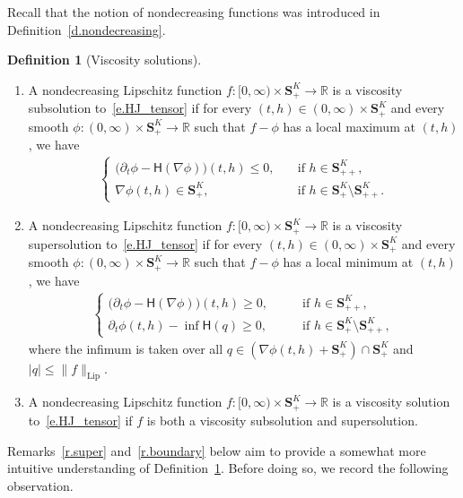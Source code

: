 \documentclass[10pt]{amsart}
\theoremstyle{definition}\newtheorem{defi}[theo]{Definition}\newtheorem{rema}[theo]{Remark}\newtheorem{exam}[theo]{Example}\newtheorem{exem}[theo]{Example}\newtheorem{nota}[theo]{Notation}
\newcommand{\R}{\mathbb{R}}
\renewcommand{\S}{\mathbf{S}}
\newcommand{\Lip}{\mathrm{Lip}}
\renewcommand{\H}{\mathsf{H}}
\renewcommand{\leq}{\leqslant}
\renewcommand{\geq}{\geqslant}
\begin{document}
Recall that the notion of nondecreasing functions was introduced in Definition~\ref{d.nondecreasing}.

\pagebreak
\begin{defi}[Viscosity solutions]\label{def:vs}
\leavevmode
\begin{enumerate}
\item \label{defi4.1.1} A nondecreasing Lipschitz function $f:[0,\infty)\times \S^K_+\to \R$ is a viscosity subsolution to~\eqref{e.HJ_tensor} if for every $(t,h) \in (0,\infty)\times \S^K_+$ and every smooth $\phi:(0,\infty)\times \S^K_+ \to \R$ such that $f-\phi$ has a local maximum at $(t,h)$, we have
\begin{align*}
\begin{cases}
\big(\partial_t \phi - \H\left(\nabla\phi\right)\big)(t,h)\leq 0, \quad &\text{if }h\in \S^K_{++},\\
\nabla\phi(t,h) \in\S^K_+, \quad &\text{if }h\in \S^K_+\setminus\S^K_{++}.
\end{cases}
\end{align*}


\item \label{item:vs_2}
A nondecreasing Lipschitz function $f:[0,\infty)\times \S^K_+\to \R$ is a viscosity supersolution to~\eqref{e.HJ_tensor} if for every $(t,h) \in (0,\infty)\times \S^K_+$ and every smooth $\phi:(0,\infty)\times \S^K_+ \to \R$ such that $f-\phi$ has a local minimum at $(t,h)$, we have
\begin{align*}
\begin{cases}
\big(\partial_t \phi - \H(\nabla\phi)\big)(t,h)\geq 0, \quad &\text{if }h\in \S^K_{++},\\
\partial_t \phi (t,h) - \inf \H(q)\geq 0,\qquad &\text{if }h\in \S^K_+\setminus\S^K_{++},
\end{cases}
\end{align*}
where the infimum is taken over all $q\in (\nabla \phi(t,h) +\S^K_+)\cap \S^K_+ $ and $|q|\leq \|f\|_{\Lip}$.



\item\label{defi4.1.3} A nondecreasing Lipschitz function $f:[0,\infty)\times \S^K_+\to \R$ is a viscosity solution to~\eqref{e.HJ_tensor} if $f$ is both a viscosity subsolution and supersolution.
\end{enumerate}
\end{defi}

Remarks~\ref{r.super} and~\ref{r.boundary} below aim to provide a somewhat more intuitive understanding of Definition~\ref{def:vs}. Before doing so, we record the following observation.
\end{document}
